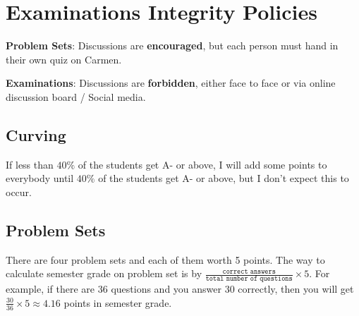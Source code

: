 \documentclass[12pt]{article}
\begin{document}

\section*{Examinations Integrity Policies}

\textbf{Problem Sets}: Discussions are \textbf{encouraged}, but each person must hand in their own quiz on Carmen.

\textbf{Examinations}: Discussions are \textbf{forbidden}, either face to face or via online discussion board / Social media.



\subsection*{Curving}

If less than $40\%$ of the students get A- or above, I will add some points to everybody until $40\%$ of the students get A- or above, but I don’t expect this to occur.

\subsection*{Problem Sets}
\label{sub:Problem_Sets}

There are four problem sets and each of them worth 5 points.
The way to calculate semester grade on problem set is by $ \frac{ \texttt{correct answers} }{ \texttt{total number of questions} } \times 5 $.
For example, if there are 36 questions and you answer 30 correctly, then you will get $ \frac{30}{36} \times 5 \approx 4.16$ points in semester grade.
\end{document}
